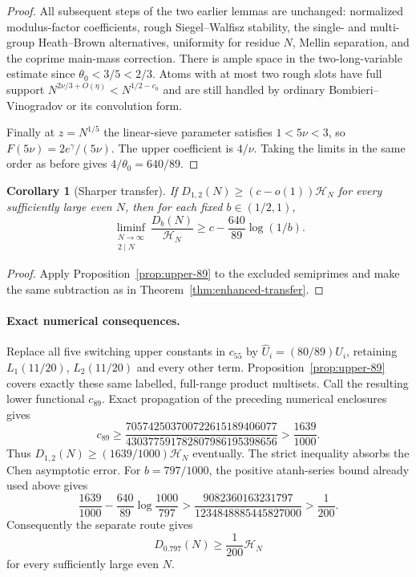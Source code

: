 \documentclass[11pt]{article}
\newtheorem{corollary}[theorem]{Corollary}
\newcommand{\HN}{\mathcal H_N}
\begin{document}
\begin{proof}
All subsequent steps of the two earlier lemmas are unchanged:
normalized modulus-factor coefficients, rough Siegel--Walfisz
stability, the single- and multi-group Heath--Brown alternatives,
uniformity for residue $N$, Mellin separation, and the coprime
main-mass correction. There is ample space in the two-long-variable
estimate since $\theta_0<3/5<2/3$.
Atoms with at most two rough slots have full support
$N^{2\nu/3+O(\eta)}<N^{1/2-c_0}$ and are still handled by
ordinary Bombieri--Vinogradov or its convolution form.

Finally at $z=N^{1/5}$ the linear-sieve parameter satisfies
$1<5\nu<3$, so $F(5\nu)=2e^\gamma/(5\nu)$.
The upper coefficient is $4/\nu$. Taking the limits in the
same order as before gives $4/\theta_0=640/89$.
\end{proof}

\begin{corollary}[Sharper transfer]
\label{cor:transfer-89}
If $D_{1,2}(N)\ge(c-o(1))\HN$ for every sufficiently large even $N$,
then for each fixed $b\in(1/2,1)$,
\[
 \liminf_{\substack{N\to\infty\\2\mid N}}\frac{D_b(N)}{\HN}
 \ge c-\frac{640}{89}\log(1/b).
\]
\end{corollary}
\begin{proof}
Apply Proposition~\ref{prop:upper-89} to the excluded semiprimes
and make the same subtraction as in Theorem~\ref{thm:enhanced-transfer}.
\end{proof}

\paragraph{Exact numerical consequences.}
Replace all five switching upper constants in $c_{55}$ by
$\widehat U_i=(80/89)U_i$, retaining $L_1(11/20)$,
$L_2(11/20)$ and every other term. Proposition~\ref{prop:upper-89}
covers exactly these same labelled, full-range product multisets.
Call the resulting lower functional $c_{89}$. Exact propagation
of the preceding numerical enclosures gives
\[
 c_{89}\ge
 \frac{705742503700722615189406077}
      {430377591782807986195398656}
 >\frac{1639}{1000}.
\]
Thus $D_{1,2}(N)\ge(1639/1000)\HN$ eventually. The strict
inequality absorbs the Chen asymptotic error. For $b=797/1000$,
the positive atanh-series bound already used above gives
\[
 \frac{1639}{1000}-\frac{640}{89}\log\frac{1000}{797}
 >\frac{9082360163231797}{1234848885445827000}
 >\frac1{200}.
\]
Consequently the separate route gives
\begin{equation}\label{eq:sharper-797}
 D_{0.797}(N)\ge\frac1{200}\HN
\end{equation}
for every sufficiently large even $N$.
\end{document}
